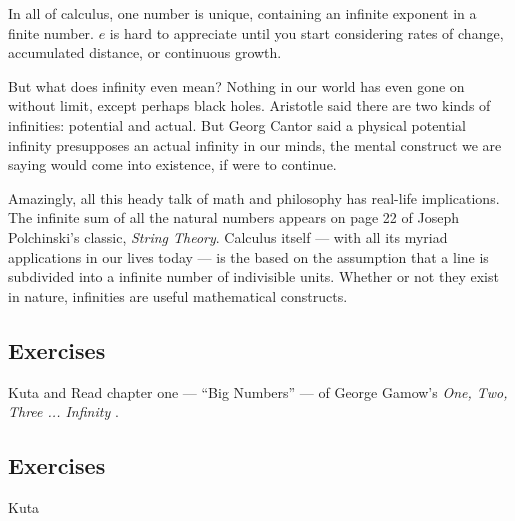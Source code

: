 


In all of calculus, one number is unique, containing an infinite exponent in a finite number.
$e$ is hard to appreciate until you start considering rates of change, 
accumulated distance, or continuous growth.  

But what does infinity even mean?  Nothing in our world has even gone on without limit,
except perhaps black holes.  Aristotle said there are two kinds of infinities: potential and
actual.  But Georg Cantor said a physical potential infinity presupposes an actual infinity
in our minds, the mental construct we are saying would come into existence, if were to 
continue.

Amazingly, all this heady talk of math and philosophy has real-life implications.  The infinite
sum of all the natural numbers appears on page 22 of Joseph Polchinski's classic, 
\textit{String Theory}.  Calculus itself --- with all its myriad applications in our lives today
--- is the based on the assumption that a line is subdivided into a infinite number of
indivisible units.  Whether or not they exist in nature, infinities are useful mathematical
constructs.





\newpage
\chapterminitoc

\newpage
{}
\newpage

\newpage
\subsection{Exercises}
Kuta and
Read chapter one --- ``Big Numbers'' --- of George Gamow's
\textit{One, Two, Three ... Infinity} .



\newpage
{}
\newpage

\newpage



\newpage
{}
\newpage

\newpage
\subsection{Exercises}
Kuta


\newpage
{}
\newpage

\newpage
